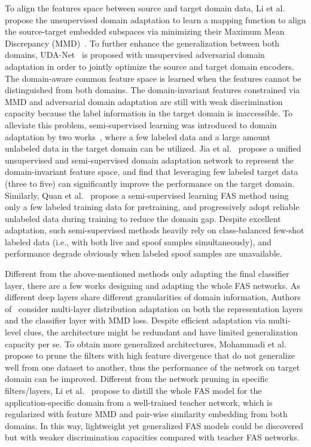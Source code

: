 \documentclass[10pt,journal,compsoc]{IEEEtran}
\begin{document}
To align the features space between source and target domain data, Li et al.~\cite{li2018unsupervised} propose the unsupervised domain adaptation to learn a mapping function to align the source-target embedded subspaces via minimizing their Maximum Mean Discrepancy (MMD)~\cite{gretton2012kernel}. To further enhance the generalization between both domains, UDA-Net~\cite{wang2019improving,wang2020unsupervised} is proposed with unsupervised adversarial domain adaptation in order to jointly optimize the source and target domain encoders. The domain-aware common feature space is learned when the features cannot be distinguished from both domains. The domain-invariant features constrained via MMD and adversarial domain adaptation are still with weak discrimination capacity because the label information in the target domain is inaccessible. To alleviate this problem, semi-supervised learning was introduced to domain adaptation by two works~\cite{jia2021unified,quan2021progressive}, where a few labeled data and a large amount unlabeled data in the target domain can be utilized. Jia et al.~\cite{jia2021unified} propose a unified unsupervised and semi-supervised domain adaptation network to represent the domain-invariant feature space, and find that leveraging few labeled target data (three to five) can significantly improve the performance on the target domain. Similarly, Quan et al.~\cite{quan2021progressive} propose a semi-supervised learning FAS method using only a few labeled training data for pretraining, and progressively adopt reliable unlabeled data during training to reduce the domain gap. Despite excellent adaptation, such semi-supervised methods heavily rely on class-balanced few-shot labeled data (i.e., with both live and spoof samples simultaneously), and performance degrade obviously when labeled spoof samples are unavailable.


Different from the above-mentioned methods only adapting the final classifier layer, there are a few works designing and adapting the whole FAS networks. As different deep layers share different granularities of domain information, Authors of~\cite{zhou2019face} consider multi-layer distribution adaptation on both the representation layers and the classifier layer with MMD loss. Despite efficient adaptation via multi-level clues, the architecture might be redundant and have limited generalization capacity per se. To obtain more generalized architectures, Mohammadi et al.~\cite{mohammadi2020domain} propose to prune the filters with high feature divergence that do not generalize well from one dataset to another, thus the performance of the network on target domain can be improved. Different from the network pruning in specific filters/layers, Li et al.~\cite{li2020face2} propose to distill the whole FAS model for the application-specific domain from a well-trained teacher network, which is regularized with feature MMD and pair-wise similarity embedding from both domains. In this way, lightweight yet generalized FAS models could be discovered but with weaker discrimination capacities compared with teacher FAS networks.  
\end{document}
